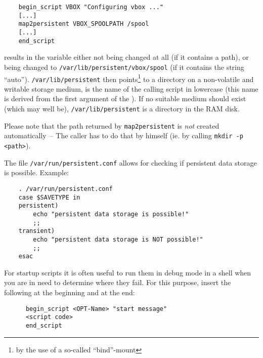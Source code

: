 \begin{example}
\begin{verbatim}
    begin_script VBOX "Configuring vbox ..."
    [...]
    map2persistent VBOX_SPOOLPATH /spool
    [...]
    end_script
\end{verbatim}
\end{example}

results in the variable  either not being changed at all
(if it contains a path), or being changed to \texttt{/var/lib/persistent/vbox/spool}
(if it contains the string ``auto''). \texttt{/var/lib/persistent} then points\footnote{
by the use of a so-called ``bind''-mount} to a directory on a non-volatile and writable
storage medium,  is the name of the calling script in lowercase
(this name is derived from the first argument of the
).
If no suitable medium should exist (which may well be),
\texttt{/var/lib/persistent} is a directory in the RAM disk.

Please note that the path returned by \texttt{map2persistent} is \emph{not}
created automatically~-- The caller has to do that by himself (ie. by calling
\texttt{mkdir -p <path>}).

The file \texttt{/var/run/persistent.conf} allows for checking if
persistent data storage is possible. Example:

\begin{example}
\begin{verbatim}
    . /var/run/persistent.conf
    case $SAVETYPE in
    persistent)
        echo "persistent data storage is possible!"
        ;;
    transient)
        echo "persistent data storage is NOT possible!"
        ;;
    esac
\end{verbatim}
\end{example}


    For startup scripts it is often useful to run them in debug mode
    in a shell when you are in need to determine where they fail.
    For this purpose, insert the following at the beginning and at the end:

\begin{example}
\begin{verbatim}
      begin_script <OPT-Name> "start message"
      <script code>
      end_script
\end{verbatim}
\end{example}

